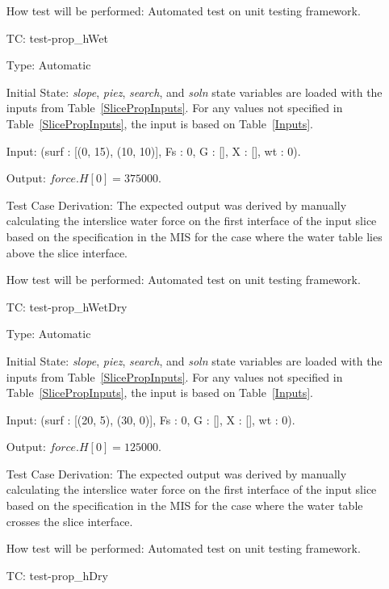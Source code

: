 \documentclass[12pt, titlepage]{article}
\newcounter{utestnum} %
\begin{document}
\begin{enumerate}[label=TC\arabic*:,ref={\arabic*}]
	How test will be performed: Automated test on unit testing framework.
	
	\item [TC\refstepcounter{utestnum}\theutestnum: 
	\label{TC_PropertyHWet}] 
	test-prop\_hWet
	
	Type: Automatic
	
	Initial State: \textit{slope}, \textit{piez}, \textit{search}, and 
	\textit{soln} state variables are loaded with the inputs from 
	Table~\ref{SlicePropInputs}. For any values not specified in 
	Table~\ref{SlicePropInputs}, the input is based on Table~\ref{Inputs}.
	
	Input: (surf : [(0, 15), (10, 10)], Fs : 0, G : [], X : [], wt : 
	0).
	
	Output: $\textit{force.H}[0] = 375000$.
	
	Test Case Derivation: The expected output was derived by manually 
	calculating the interslice water force on the first interface of the input 
	slice based on the specification in the MIS for the case where the water 
	table lies above the slice interface.
	
	How test will be performed: Automated test on unit testing framework.
	
	\item [TC\refstepcounter{utestnum}\theutestnum: 
	\label{TC_PropertyHWetDry}] 
	test-prop\_hWetDry
	
	Type: Automatic
	
	Initial State: \textit{slope}, \textit{piez}, \textit{search}, and 
	\textit{soln} state variables are loaded with the inputs from 
	Table~\ref{SlicePropInputs}. For any values not specified in 
	Table~\ref{SlicePropInputs}, the input is based on Table~\ref{Inputs}.
	
	Input: (surf : [(20, 5), (30, 0)], Fs : 0, G : [], X : [], wt : 
	0).
	
	Output: $\textit{force.H}[0] = 125000$.
	
	Test Case Derivation: The expected output was derived by manually 
	calculating the interslice water force on the first interface of the input 
	slice based on the specification in the	MIS for the case where the water 
	table crosses the slice interface.
	
	How test will be performed: Automated test on unit testing framework.
	
	\item [TC\refstepcounter{utestnum}\theutestnum: 
	\label{TC_PropertyHDry}] 
	test-prop\_hDry
	

\end{enumerate}
\end{document}

